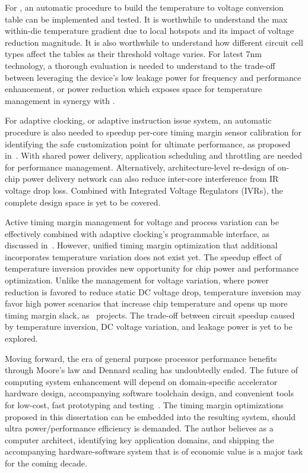 For \tistates, an automatic procedure to build the temperature to voltage conversion table can be implemented and tested. It is worthwhile to understand the max within-die temperature gradient due to local hotspots and its impact of voltage reduction magnitude. It is also worthwhile to understand how different circuit cell types affect the \tistate tables as their threshold voltage varies. For latest 7nm technology, a thorough evaluation is needed to understand to the trade-off between leveraging the device's low leakage power for frequency and performance enhancement, or power reduction which exposes space for temperature management in synergy with \tistates.

For adaptive clocking, or adaptive instruction issue system, an automatic procedure is also needed to speedup per-core timing margin sensor calibration for identifying the safe customization point for ultimate performance, as proposed in~. With shared power delivery, application scheduling and throttling are needed for performance management. Alternatively, architecture-level re-design of on-chip power delivery network can also reduce inter-core interference from IR voltage drop loss. Combined with Integrated Voltage Regulators (IVRs), the complete design space is yet to be covered.

Active timing margin management for voltage and process variation can be effectively combined with adaptive clocking's programmable interface, as discussed in~. However, unified timing margin optimization that additional incorporates temperature variation does not exist yet. The speedup effect of temperature inversion provides new opportunity for chip power and performance optimization. Unlike the management for voltage variation, where power reduction is favored to reduce static DC voltage drop, temperature inversion may favor high power scenarios that increase chip temperature and opens up more timing margin slack, as~ projects. The trade-off between circuit speedup caused by temperature inversion, DC voltage variation, and leakage power is yet to be explored.

Moving forward, the era of general purpose processor performance benefits through Moore's law and Dennard scaling has undoubtedly ended. The future of computing system enhancement will depend on domain-specific accelerator hardware design, accompanying software toolchain design, and convenient tools for low-cost, fast prototyping and testing~\cite{hennessynew}. The timing margin optimizations proposed in this dissertation can be embedded into the resulting system, should ultra power/performance efficiency is demanded. The author believes as a computer architect, identifying key application domains, and shipping the accompanying hardware-software system that is of economic value is a major task for the coming decade.